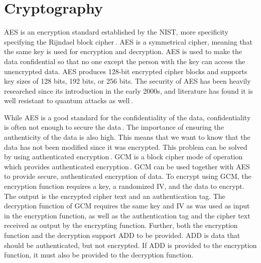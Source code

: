 \section{Cryptography}
\label{sec:back_crypto}
\gls{AES} is an encryption standard established by the \gls{NIST}, more specificity specifying the Rijndael block cipher\,\cite{kumarvermaPerformanceAnalysisRC62012}. \gls{AES} is a symmetrical cipher, meaning that the same key is used for encryption and decryption. \gls{AES} is used to make the data confidential so that no one except the person with the key can access the unencrypted data. \gls{AES} produces \mbox{128-bit} encrypted cipher blocks and supports key sizes of 128 bits, 192 bits, or 256 bits. The security of \gls{AES} has been heavily researched since its introduction in the early 2000s, and literature has found it is well resistant to quantum attacks as well\,\cite{bonnetainQuantumSecurityAnalysis2019}.

While \gls{AES} is a good standard for the confidentiality of the data, confidentiality is often not enough to secure the data\,\cite{rosswallrabensteinWhenItComes2021}. The importance of ensuring the authenticity of the data is also high. This means that we want to know that the data has not been modified since it was encrypted. This problem can be solved by using authenticated encryption\,\cite{khovratovichAnswerWhyShould2013}. \gls{GCM} is a block cipher mode of operation which provides authenticated encryption\,\cite{mcgrewGaloisCounterMode2004}. \gls{GCM} can be used together with \gls{AES} to provide secure, authenticated encryption of data. To encrypt using \gls{GCM}, the encryption function requires a key, a randomized \gls{IV}, and the data to encrypt. The output is the encrypted cipher text and an authentication tag. The decryption function of \gls{GCM} requires the same key and \gls{IV} as was used as input in the encryption function, as well as the authentication tag and the cipher text received as output by the encrypting function. Further, both the encryption function and the decryption support \gls{ADD} to be provided. \gls{ADD} is data that should be authenticated, but not encrypted. If \gls{ADD} is provided to the encryption function, it must also be provided to the decryption function.

